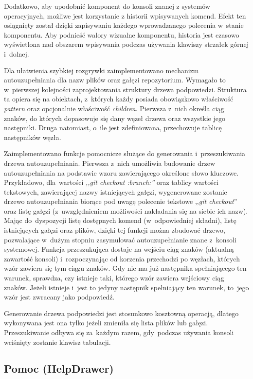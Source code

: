 \documentclass[12pt,a4paper,polish,thesis]{dcsbook}
\begin{document}
{	Dodatkowo, aby upodobnić komponent do konsoli znanej z systemów operacyjnych, możliwe jest korzystanie z historii wpisywanych komend. Efekt ten osiągnięty został dzięki zapisywaniu każdego wprowadzanego polecenia w~stanie komponentu. Aby podnieść walory wizualne komponentu, historia jest czasowo wyświetlona nad obszarem wpisywania podczas używania klawiszy strzałek górnej i~dolnej.

	Dla ułatwienia szybkiej rozgrywki zaimplementowano mechanizm autouzupełniania dla nazw plików oraz gałęzi repozytorium. Wymagało to w~pierwszej kolejności zaprojektowania struktury drzewa podpowiedzi. Struktura ta opiera się na obiektach, z~których każdy posiada obowiązkowo właściwość \textit{pattern} oraz opcjonalnie właściwość \textit{children}. Pierwsza z~nich określa ciąg znaków, do których dopasowuje się dany węzeł drzewa oraz wszystkie jego następniki. Druga natomiast, o~ile jest zdefiniowana, przechowuje tablicę następników węzła.

	Zaimplementowano funkcje pomocnicze służące do generowania i~przeszukiwania drzewa autouzupełniania. Pierwsza z~nich umożliwia budowanie drzew autouzupełniania na podstawie wzoru zawierającego określone słowo kluczowe. Przykładowo, dla~wartości \textit{,,git checkout :branch:''} oraz tablicy wartości tekstowych, zawierającej nazwy istniejących gałęzi, wygenerowane zostanie drzewo autouzupełniania biorące pod uwagę polecenie tekstowe ,,\textit{git checkout}'' oraz listę gałęzi (z~uwzględnieniem możliwości nakładania się na siebie ich nazw). Mając do~dyspozycji listę dostępnych komend (w~odpowiedniej składni), listę istniejących gałęzi oraz plików, dzięki tej funkcji można zbudować drzewo, pozwalające w~dużym stopniu zasymulować autouzupełnianie znane z~konsoli systemowej. Funkcja przeszukująca dostaje na wejściu ciąg znaków (aktualną zawartość konsoli) i~rozpoczynając od korzenia przechodzi po węzłach, których wzór zawiera się tym ciągu znaków. Gdy nie ma już następnika spełniającego ten warunek, sprawdza, czy istnieje taki, którego wzór zawiera wejściowy ciąg znaków. Jeżeli istnieje i~jest to jedyny następnik spełniający ten warunek, to~jego wzór jest zwracany jako podpowiedź.

	Generowanie drzewa podpowiedzi jest stosunkowo kosztowną operacją, dlatego wykonywana jest ona tylko jeżeli zmieniła się lista plików lub gałęzi. Przeszukiwanie odbywa się za~każdym razem, gdy~podczas używania konsoli wciśnięty zostanie klawisz tabulacji.

	\subsection{Pomoc (HelpDrawer)}

}
\end{document}
